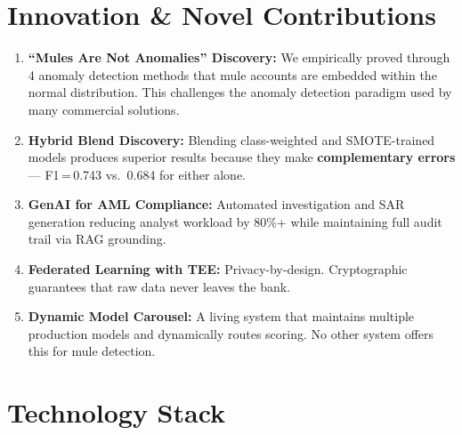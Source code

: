 \documentclass[11pt, a4paper]{article}
\begin{document}
\section{Innovation \& Novel Contributions}

\begin{enumerate}
    \item \textbf{``Mules Are Not Anomalies'' Discovery:} We empirically proved through 4 anomaly detection methods that mule accounts are embedded within the normal distribution. This challenges the anomaly detection paradigm used by many commercial solutions.

    \item \textbf{Hybrid Blend Discovery:} Blending class-weighted and SMOTE-trained models produces superior results because they make \textbf{complementary errors} --- F1\,=\,0.743 vs.\ 0.684 for either alone.

    \item \textbf{GenAI for AML Compliance:} Automated investigation and SAR generation reducing analyst workload by 80\%+ while maintaining full audit trail via RAG grounding.

    \item \textbf{Federated Learning with TEE:} Privacy-by-design. Cryptographic guarantees that raw data never leaves the bank.

    \item \textbf{Dynamic Model Carousel:} A living system that maintains multiple production models and dynamically routes scoring. No other system offers this for mule detection.
\end{enumerate}


\section{Technology Stack}
\end{document}

